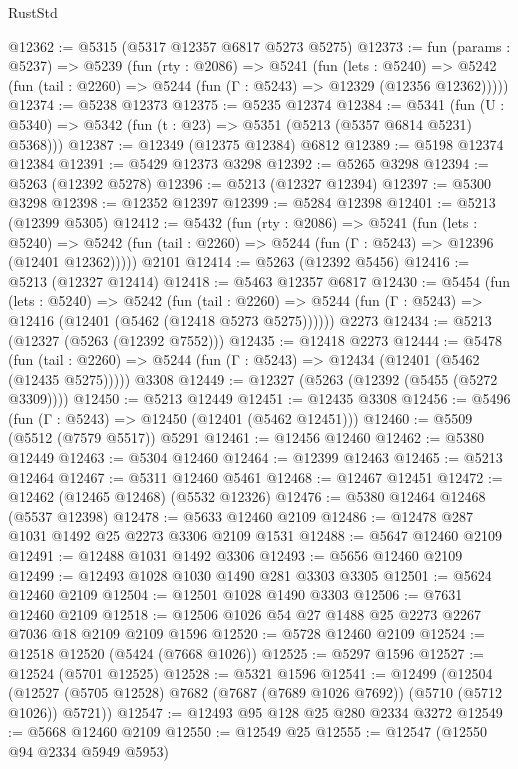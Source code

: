 \begin{lexlean}{RustStd}
\begin{coremodule}
@12362 := @5315 (@5317 @12357 @6817 @5273 @5275)
@12373 := fun (params : @5237) =>
  @5239
    (fun (rty : @2086) =>
    @5241
      (fun (lets : @5240) =>
      @5242 (fun (tail : @2260) => @5244 (fun (Γ : @5243) => @12329 (@12356 @12362)))))
@12374 := @5238 @12373
@12375 := @5235 @12374
@12384 := @5341
    (fun (U : @5340) => @5342 (fun (t : @23) => @5351 (@5213 (@5357 @6814 @5231) @5368)))
@12387 := @12349 (@12375 @12384) @6812
@12389 := @5198 @12374 @12384
@12391 := @5429 @12373 @3298
@12392 := @5265 @3298
@12394 := @5263 (@12392 @5278)
@12396 := @5213 (@12327 @12394)
@12397 := @5300 @3298
@12398 := @12352 @12397
@12399 := @5284 @12398
@12401 := @5213 (@12399 @5305)
@12412 := @5432
    (fun (rty : @2086) =>
    @5241
      (fun (lets : @5240) =>
      @5242 (fun (tail : @2260) => @5244 (fun (Γ : @5243) => @12396 (@12401 @12362)))))
    @2101
@12414 := @5263 (@12392 @5456)
@12416 := @5213 (@12327 @12414)
@12418 := @5463 @12357 @6817
@12430 := @5454
    (fun (lets : @5240) =>
    @5242
      (fun (tail : @2260) =>
      @5244 (fun (Γ : @5243) => @12416 (@12401 (@5462 (@12418 @5273 @5275))))))
    @2273
@12434 := @5213 (@12327 (@5263 (@12392 @7552)))
@12435 := @12418 @2273
@12444 := @5478
    (fun (tail : @2260) => @5244 (fun (Γ : @5243) => @12434 (@12401 (@5462 (@12435 @5275)))))
    @3308
@12449 := @12327 (@5263 (@12392 (@5455 (@5272 @3309))))
@12450 := @5213 @12449
@12451 := @12435 @3308
@12456 := @5496 (fun (Γ : @5243) => @12450 (@12401 (@5462 @12451)))
@12460 := @5509 (@5512 (@7579 @5517)) @5291
@12461 := @12456 @12460
@12462 := @5380 @12449
@12463 := @5304 @12460
@12464 := @12399 @12463
@12465 := @5213 @12464
@12467 := @5311 @12460 @5461
@12468 := @12467 @12451
@12472 := @12462 (@12465 @12468) (@5532 @12326)
@12476 := @5380 @12464 @12468 (@5537 @12398)
@12478 := @5633 @12460 @2109
@12486 := @12478 @287 @1031 @1492 @25 @2273 @3306 @2109 @1531
@12488 := @5647 @12460 @2109
@12491 := @12488 @1031 @1492 @3306
@12493 := @5656 @12460 @2109
@12499 := @12493 @1028 @1030 @1490 @281 @3303 @3305
@12501 := @5624 @12460 @2109
@12504 := @12501 @1028 @1490 @3303
@12506 := @7631 @12460 @2109
@12518 := @12506 @1026 @54 @27 @1488 @25 @2273 @2267 @7036 @18 @2109 @2109 @1596
@12520 := @5728 @12460 @2109
@12524 := @12518 @12520 (@5424 (@7668 @1026))
@12525 := @5297 @1596
@12527 := @12524 (@5701 @12525)
@12528 := @5321 @1596
@12541 := @12499
    (@12504 (@12527 (@5705 @12528) @7682 (@7687 (@7689 @1026 @7692)) (@5710 (@5712 @1026)) @5721))
@12547 := @12493 @95 @128 @25 @280 @2334 @3272
@12549 := @5668 @12460 @2109
@12550 := @12549 @25
@12555 := @12547 (@12550 @94 @2334 @5949 @5953)

\end{coremodule}
\end{lexlean}
